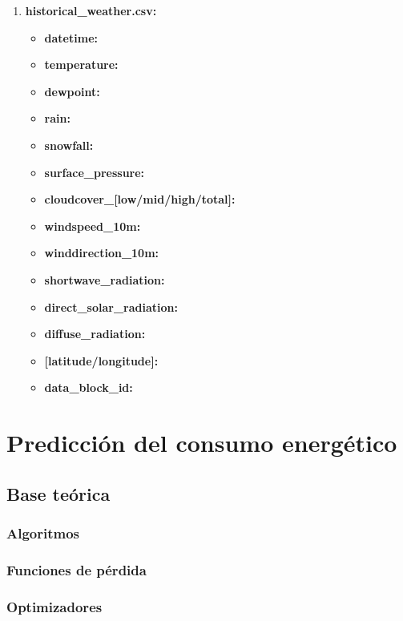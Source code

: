 \documentclass[a4paper,12pt]{article}
\begin{document}
\begin{enumerate}
    \item \textbf{historical\_weather.csv:}
    \begin{itemize}
        \item \textbf{datetime:}
        \item \textbf{temperature:}
        \item \textbf{dewpoint:}
        \item \textbf{rain:}
        \item \textbf{snowfall:}
        \item \textbf{surface\_pressure:}
        \item \textbf{cloudcover\_[low/mid/high/total]:}
        \item \textbf{windspeed\_10m:}
        \item \textbf{winddirection\_10m:}
        \item \textbf{shortwave\_radiation:}
        \item \textbf{direct\_solar\_radiation:}
        \item \textbf{diffuse\_radiation:}
        \item \textbf{[latitude/longitude]:}
        \item \textbf{data\_block\_id:}
    \end{itemize}

\end{enumerate}

\section{Predicción del consumo energético}

\subsection{Base teórica}

\subsubsection{Algoritmos}

\subsubsection{Funciones de pérdida}

\subsubsection{Optimizadores}
\end{document}
